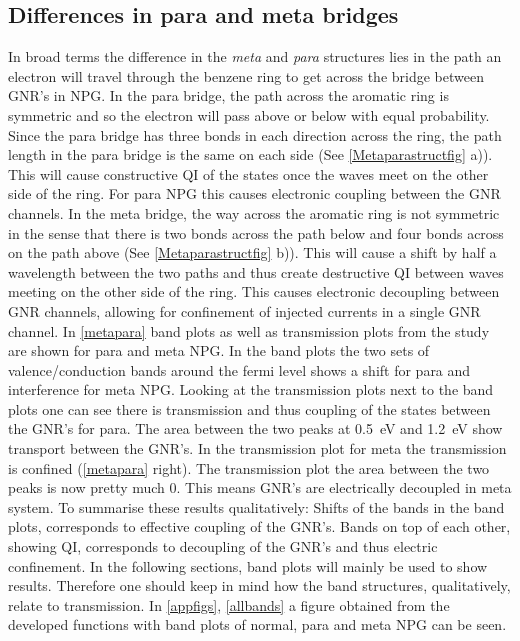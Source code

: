 \subsection{Differences in para and meta bridges}\label{metaparasection}
In broad terms the difference in the \textit{meta} and \textit{para} structures lies in the path an electron will travel through the benzene ring to get across the bridge between GNR's in NPG. In the para bridge, the path across the aromatic ring is symmetric and so the electron will pass above or below with equal probability. Since the para bridge has three bonds in each direction across the ring, the path length in the para bridge is the same on each side (See \cref{Metaparastructfig} a)). This will cause constructive QI of the states once the waves meet on the other side of the ring. For para NPG this causes electronic coupling between the GNR channels. In the meta bridge, the way across the aromatic ring is not symmetric in the sense that there is two bonds across the path below and four bonds across on the path above (See \cref{Metaparastructfig} b)). This will cause a shift by half a wavelength between the two paths and thus create destructive QI between waves meeting on the other side of the ring. This causes electronic decoupling between GNR channels, allowing for confinement of injected currents in a single GNR channel\cite{unpub}. In \cref{metapara} band plots as well as transmission plots from the study\cite{unpub} are shown for para and meta NPG. In the band plots the two sets of valence/conduction bands around the fermi level shows a shift for para and interference for meta NPG. Looking at the transmission plots next to the band plots one can see there is transmission and thus coupling of the states between the GNR's for para. The area between the two peaks at \SI{0.5}{\electronvolt} and  \SI{1.2}{\electronvolt} show transport between the GNR's. In the transmission plot for meta the transmission is confined (\cref{metapara} right). The transmission plot the area between the two peaks is now pretty much 0. This means GNR's are electrically decoupled in meta system. To summarise these results qualitatively: Shifts of the bands in the band plots, corresponds to effective coupling of the GNR's. Bands on top of each other, showing QI, corresponds to decoupling of the GNR's and thus electric confinement. In the following sections, band plots will mainly be used to show results. Therefore one should keep in mind how the band structures, qualitatively, relate to transmission. In \cref{appfigs}, \cref{allbands} a figure obtained from the developed functions with band plots of normal, para and meta NPG can be seen.
